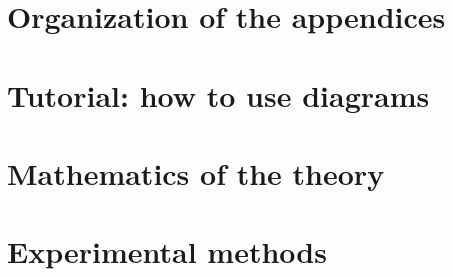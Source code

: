     
    
    \appendix

    \newpage
    \section*{Organization of the appendices}
        

    \newpage
    \section{Tutorial: how to use diagrams}\label{appendix:tutorial}
        
    
    \newpage
    \section{Mathematics of the theory}\label{appendix:math}
        
    
    \newpage
    \section{Experimental methods}\label{appendix:experiments}
        
    


